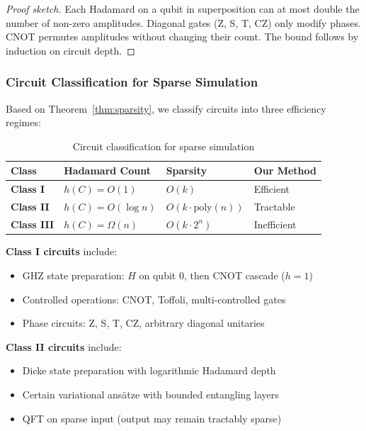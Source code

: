 \documentclass[11pt,twocolumn]{article}
\begin{document}
\begin{proof}[Proof sketch]
Each Hadamard on a qubit in superposition can at most double the number of non-zero amplitudes. Diagonal gates (Z, S, T, CZ) only modify phases. CNOT permutes amplitudes without changing their count. The bound follows by induction on circuit depth.
\end{proof}

\subsubsection{Circuit Classification for Sparse Simulation}

Based on Theorem~\ref{thm:sparsity}, we classify circuits into three efficiency regimes:

\begin{table}[H]
\centering
\caption{Circuit classification for sparse simulation}
\label{tab:circuitclass}
\begin{tabular}{@{}llll@{}}
\toprule
Class & Hadamard Count & Sparsity & Our Method \\
\midrule
\textbf{Class I} & $h(C) = O(1)$ & $O(k)$ & Efficient \\
\textbf{Class II} & $h(C) = O(\log n)$ & $O(k \cdot \text{poly}(n))$ & Tractable \\
\textbf{Class III} & $h(C) = \Omega(n)$ & $O(k \cdot 2^n)$ & Inefficient \\
\bottomrule
\end{tabular}
\end{table}

\textbf{Class I circuits} include:
\begin{itemize}
    \item GHZ state preparation: $H$ on qubit 0, then CNOT cascade ($h = 1$)
    \item Controlled operations: CNOT, Toffoli, multi-controlled gates
    \item Phase circuits: Z, S, T, CZ, arbitrary diagonal unitaries
\end{itemize}

\textbf{Class II circuits} include:
\begin{itemize}
    \item Dicke state preparation with logarithmic Hadamard depth
    \item Certain variational ans\"atze with bounded entangling layers
    \item QFT on sparse input (output may remain tractably sparse)
\end{itemize}
\end{document}
